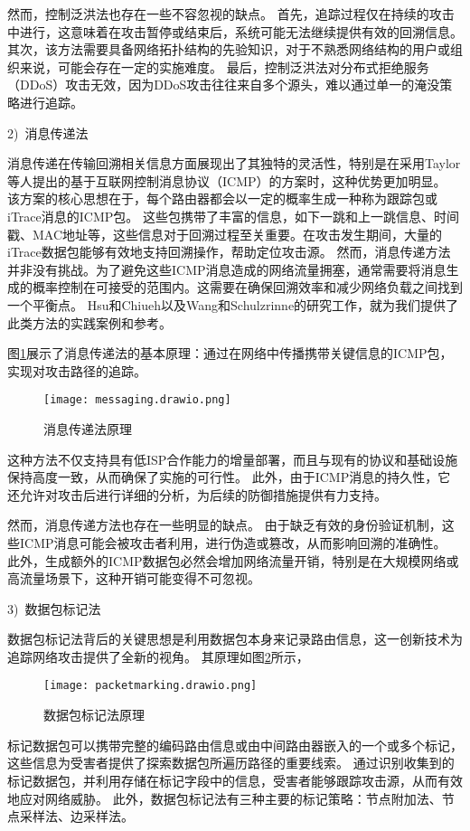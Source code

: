 然而，控制泛洪法也存在一些不容忽视的缺点。
首先，追踪过程仅在持续的攻击中进行，这意味着在攻击暂停或结束后，系统可能无法继续提供有效的回溯信息。
其次，该方法需要具备网络拓扑结构的先验知识，对于不熟悉网络结构的用户或组织来说，可能会存在一定的实施难度。
最后，控制泛洪法对分布式拒绝服务（DDoS）攻击无效，因为DDoS攻击往往来自多个源头，难以通过单一的淹没策略进行追踪。

2)~消息传递法\par
消息传递在传输回溯相关信息方面展现出了其独特的灵活性，特别是在采用Taylor等人提出的基于互联网控制消息协议（ICMP）的方案时，这种优势更加明显\cite{Taylor2014ICMP}。
该方案的核心思想在于，每个路由器都会以一定的概率生成一种称为跟踪包或iTrace消息的ICMP包。
这些包携带了丰富的信息，如下一跳和上一跳信息、时间戳、MAC地址等，这些信息对于回溯过程至关重要。在攻击发生期间，大量的iTrace数据包能够有效地支持回溯操作，帮助定位攻击源。
然而，消息传递方法并非没有挑战。为了避免这些ICMP消息造成的网络流量拥塞，通常需要将消息生成的概率控制在可接受的范围内。这需要在确保回溯效率和减少网络负载之间找到一个平衡点。
Hsu和Chiueh\cite{Hsu2003TrafficSourceIdentification}以及Wang和Schulzrinne\cite{WangSchulzrinne2004DoS,WangSchulzrinne2004ReflectiveDoS}的研究工作，就为我们提供了此类方法的实践案例和参考。

图\ref{fig:messaging}展示了消息传递法的基本原理：通过在网络中传播携带关键信息的ICMP包，实现对攻击路径的追踪。
\begin{figure}[h]
  \centering
  \texttt{[image: messaging.drawio.png]}
  \caption{消息传递法原理}
  \label{fig:messaging}
\end{figure}
这种方法不仅支持具有低ISP合作能力的增量部署，而且与现有的协议和基础设施保持高度一致，从而确保了实施的可行性。
此外，由于ICMP消息的持久性，它还允许对攻击后进行详细的分析，为后续的防御措施提供有力支持。

然而，消息传递方法也存在一些明显的缺点。
由于缺乏有效的身份验证机制，这些ICMP消息可能会被攻击者利用，进行伪造或篡改，从而影响回溯的准确性。
此外，生成额外的ICMP数据包必然会增加网络流量开销，特别是在大规模网络或高流量场景下，这种开销可能变得不可忽视。


3)~数据包标记法\par
数据包标记法背后的关键思想是利用数据包本身来记录路由信息，这一创新技术为追踪网络攻击提供了全新的视角。
其原理如图\ref{fig:packet_marking}所示，
\begin{figure}[h]
  \centering
  \texttt{[image: packetmarking.drawio.png]}
  \caption{数据包标记法原理}
  \label{fig:packet_marking}
\end{figure}
标记数据包可以携带完整的编码路由信息或由中间路由器嵌入的一个或多个标记，这些信息为受害者提供了探索数据包所遍历路径的重要线索。
通过识别收集到的标记数据包，并利用存储在标记字段中的信息，受害者能够跟踪攻击源，从而有效地应对网络威胁。
此外，数据包标记法有三种主要的标记策略：节点附加法、节点采样法、边采样法\cite{Alenezi2011}。

